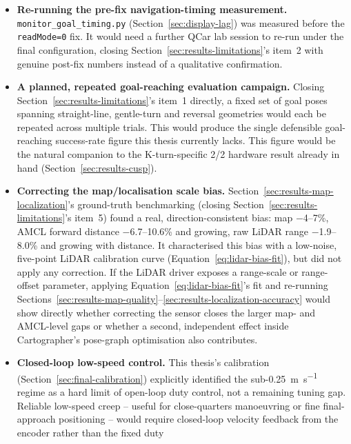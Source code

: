 \begin{itemize}
  \item \textbf{Re-running the pre-fix navigation-timing measurement.}
    \texttt{monitor\_goal\_timing.py} (Section~\ref{sec:display-lag})
    was measured before the \texttt{readMode=0} fix. It would need a
    further QCar lab session to re-run under the final configuration,
    closing Section~\ref{sec:results-limitations}'s item~2 with genuine
    post-fix numbers instead of a qualitative confirmation.
  \item \textbf{A planned, repeated goal-reaching evaluation
    campaign.} Closing Section~\ref{sec:results-limitations}'s item~1
    directly, a fixed set of goal poses spanning straight-line,
    gentle-turn and reversal geometries would each be repeated across
    multiple trials. This would produce the single defensible
    goal-reaching success-rate figure this thesis currently lacks.
    This figure would be the natural companion to the K-turn-specific
    2/2 hardware result already in hand (Section~\ref{sec:results-cusp}).
  \item \textbf{Correcting the map/localisation scale bias.}
    Section~\ref{sec:results-map-localization}'s ground-truth
    benchmarking (closing Section~\ref{sec:results-limitations}'s
    item~5) found a real, direction-consistent bias: map $-$4--7\%,
    AMCL forward distance $-$6.7--10.6\% and growing, raw LiDAR range
    $-$1.9--8.0\% and growing with distance. It characterised this
    bias with a low-noise, five-point LiDAR calibration curve
    (Equation~\ref{eq:lidar-bias-fit}), but did not apply any
    correction. If the LiDAR driver exposes a range-scale or
    range-offset parameter, applying Equation~\ref{eq:lidar-bias-fit}'s
    fit and re-running
    Sections~\ref{sec:results-map-quality}--\ref{sec:results-localization-accuracy}
    would show directly whether correcting the sensor closes the
    larger map- and AMCL-level gaps or whether a second, independent
    effect inside Cartographer's pose-graph optimisation also
    contributes.
  \item \textbf{Closed-loop low-speed control.} This thesis's
    calibration (Section~\ref{sec:final-calibration}) explicitly
    identified the sub-\SI{0.25}{\meter\per\second} regime as a hard
    limit of open-loop duty control, not a remaining tuning gap.
    Reliable low-speed creep -- useful for close-quarters manoeuvring
   or fine final-approach positioning -- would require closed-loop
    velocity feedback from the encoder rather than the fixed duty

\end{itemize}

